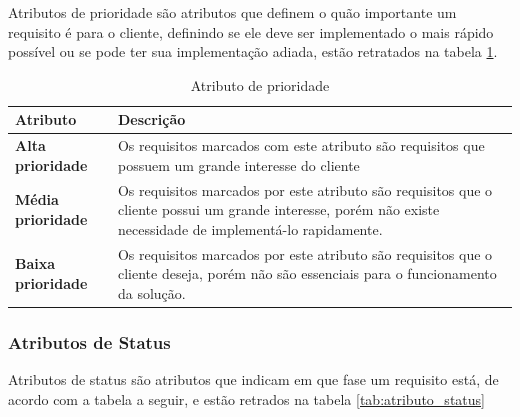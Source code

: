 Atributos de prioridade são atributos que definem o quão importante um requisito é para o cliente, definindo se ele deve ser implementado o mais rápido possível ou se pode ter sua implementação adiada, estão retratados na tabela \ref{tab:atributo_prioridade}.

\begin{table}[H]
\begin{tabular}{|p{4cm}|p{11cm}|}

\hline
\textbf{Atributo} &
\textbf{Descrição}
\\ \hline

\textbf{Alta prioridade} &
Os requisitos marcados com este atributo são requisitos que possuem um grande interesse do cliente
\\ \hline

\textbf{Média prioridade} &
Os requisitos marcados por este atributo são requisitos que o cliente possui um grande interesse, porém não existe necessidade de implementá-lo rapidamente.
\\ \hline

\textbf{Baixa prioridade} &
Os requisitos marcados por este atributo são requisitos que o cliente deseja, porém não são essenciais para o funcionamento da solução.
\\ \hline

\end{tabular}
\caption{Atributo de prioridade}
\label{tab:atributo_prioridade}
\end{table}

\subsubsection{Atributos de Status\\}

Atributos de status são atributos que indicam em que fase um requisito está, de acordo com a tabela a seguir, e estão retrados na tabela \ref{tab:atributo_status}

